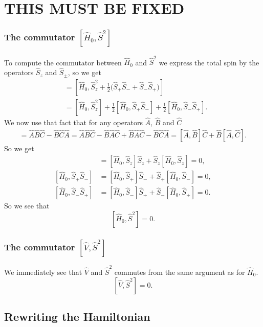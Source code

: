 \documentclass[a4paper, 11pt, notitlepage, english]{article}
\newcommand{\op}[1]{\hat{#1}}
\begin{document}
\section{THIS MUST BE FIXED}

\clearpage

\subsubsection*{The commutator $[\op{H}_0, \op{S}^2]$}

To compute the commutator between $\op{H}_0$ and $\op{S}^2$ we express the total spin by the operators $\op{S}_z$ and $\op{S}_\pm$, so we get
\begin{align*}
[\op{H}_0, \op{S}^2] &= [\op{H}_0, \op{S}_z^2 + \frac{1}{2}\big(\op{S}_+\op{S}_- + \op{S}_-\op{S}_+\big)] \\
&= [\op{H}_0, \op{S}_z^2] + \frac{1}{2}[\op{H}_0, \op{S}_+\op{S}_-] + \frac{1}{2}[\op{H}_0, \op{S}_-\op{S}_+].
\end{align*}
We now use that fact that for any operators $\op{A}$, $\op{B}$ and $\op{C}$
\begin{align*}
[\op{A},\op{B}\op{C}] = \op{A}\op{B}\op{C} - \op{B}\op{C}\op{A} = \op{A}\op{B}\op{C} - \op{B}\op{A}\op{C} + \op{B}\op{A}\op{C} - \op{B}\op{C}\op{A} = [\op{A},\op{B}]\op{C} + \op{B}[\op{A},\op{C}].
\end{align*}
So we get
\begin{align*}
[\op{H}_0, \op{S}_z^2] &= [\op{H}_0, \op{S}_z]\op{S}_z + \op{S}_z[\op{H}_0, \op{S}_z] = 0, \\
[\op{H}_0, \op{S}_+\op{S}_-] &= [\op{H}_0, \op{S}_+]\op{S}_- + \op{S}_+[\op{H}_0, \op{S}_-] = 0, \\
[\op{H}_0, \op{S}_-\op{S}_+] &= [\op{H}_0, \op{S}_-]\op{S}_+ + \op{S}_-[\op{H}_0, \op{S}_+] = 0.
\end{align*}
So we see that 
$$[\op{H}_0, \op{S}^2] = 0.$$

\subsubsection*{The commutator $[\op{V}, \op{S}^2]$}

We immediately see that $\op{V}$ and $\op{S}^2$ commutes from the same argument as for $\op{H}_0$.
$$[\op{V}, \op{S}^2] = 0.$$

\subsection*{Rewriting the Hamiltonian}
\end{document}
